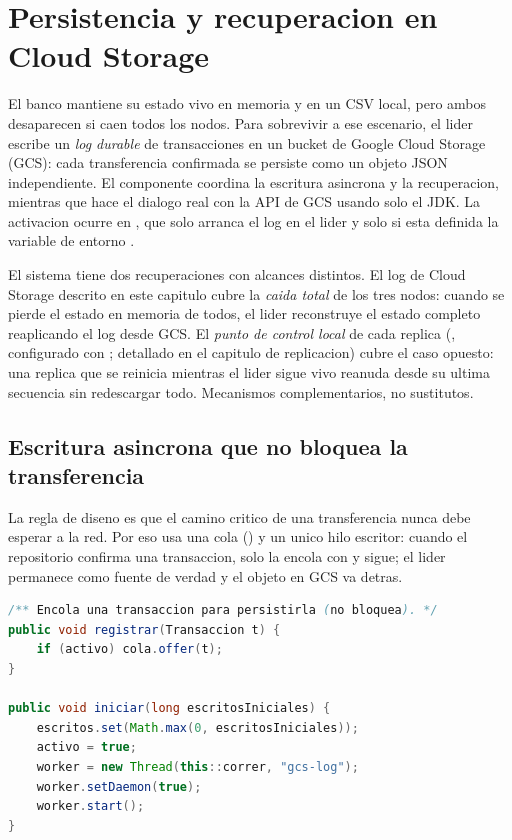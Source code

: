\section{Persistencia y recuperacion en Cloud Storage}

El banco mantiene su estado vivo en memoria y en un CSV local, pero ambos
desaparecen si caen todos los nodos. Para sobrevivir a ese escenario, el lider
escribe un \emph{log durable} de transacciones en un bucket de Google Cloud
Storage (GCS): cada transferencia confirmada se persiste como un objeto JSON
independiente. El componente  coordina la
escritura asincrona y la recuperacion, mientras que 
hace el dialogo real con la API de GCS usando solo el JDK. La activacion ocurre
en , que solo arranca el log en el lider y solo
si esta definida la variable de entorno .

\begin{nota}
El sistema tiene dos recuperaciones con alcances distintos. El log de Cloud
Storage descrito en este capitulo cubre la \emph{caida total} de los tres nodos:
cuando se pierde el estado en memoria de todos, el lider reconstruye el estado
completo reaplicando el log desde GCS. El \emph{punto de control local} de cada
replica (, configurado con
; detallado en el capitulo de replicacion) cubre el
caso opuesto: una replica que se reinicia mientras el lider sigue vivo reanuda
desde su ultima secuencia sin redescargar todo. Mecanismos complementarios, no
sustitutos.
\end{nota}

\subsection{Escritura asincrona que no bloquea la transferencia}

La regla de diseno es que el camino critico de una transferencia nunca debe
esperar a la red. Por eso  usa una cola
() y un unico hilo escritor: cuando el repositorio confirma
una transaccion, solo la encola con  y sigue; el lider
permanece como fuente de verdad y el objeto en GCS va detras.

\begin{lstlisting}[language=Java,caption={El registro encola y no bloquea; un hilo daemon vacia la cola}]
/** Encola una transaccion para persistirla (no bloquea). */
public void registrar(Transaccion t) {
    if (activo) cola.offer(t);
}

public void iniciar(long escritosIniciales) {
    escritos.set(Math.max(0, escritosIniciales));
    activo = true;
    worker = new Thread(this::correr, "gcs-log");
    worker.setDaemon(true);
    worker.start();
}
\end{lstlisting}

